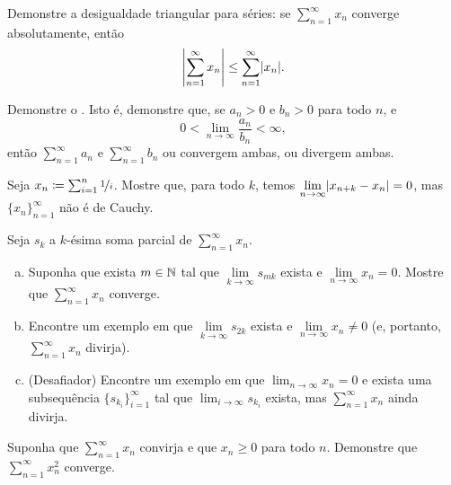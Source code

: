 \begin{exercise}
Demonstre a desigualdade triangular para séries:
se $\sum_{n=1}^\infty x_n$ converge absolutamente, então
\begin{equation*}
\left\lvert {\sum_{n=1}^\infty x_n} \right\rvert \leq
\sum_{n=1}^\infty \lvert {x_n} \rvert .
\end{equation*}
\end{exercise}

\begin{exercise}
Demonstre o \emph{}. Isto é, demonstre que, se
$a_n > 0$ e $b_n > 0$ para todo $n$, e
\begin{equation*}
0 < \lim_{n\to\infty} \frac{a_n}{b_n} < \infty ,
\end{equation*}
então $\sum_{n=1}^\infty a_n$ e $\sum_{n=1}^\infty b_n$ ou convergem ambas, ou divergem ambas.
\end{exercise}

\begin{exercise} \label{exercise:badnocauchy}
Seja $x_n \coloneqq \sum_{i=1}^n \nicefrac{1}{i}$. Mostre que, para todo $k$,
temos
$\displaystyle \lim_{n\to\infty} \lvert {x_{n+k}-x_n} \rvert = 0$, mas
$\{ x_n \}_{n=1}^\infty$ não é de Cauchy.
\end{exercise}

\begin{samepage}
\begin{exercise}
Seja $s_k$ a $k$-ésima soma parcial de $\sum_{n=1}^\infty x_n$.
\begin{enumerate}[a)]
\item
Suponha que exista $m \in {\mathbb{N}}$ tal que $\lim\limits_{k\to\infty}
s_{mk}$ exista e $\lim\limits_{n\to\infty} x_n = 0$. Mostre que
$\sum_{n=1}^\infty x_n$ converge.
\item
Encontre um exemplo em que $\lim\limits_{k\to\infty} s_{2k}$ exista e
$\lim\limits_{n\to\infty} x_n \neq 0$ (e, portanto, $\sum_{n=1}^\infty x_n$ divirja).
\item
(Desafiador) Encontre um exemplo em que $\lim_{n\to\infty} x_n = 0$ e exista
uma subsequência $\{ s_{k_i} \}_{i=1}^\infty$ tal que $\displaystyle \lim_{i\to\infty} s_{k_i}$ exista,
mas $\sum_{n=1}^\infty x_n$ ainda divirja.
\end{enumerate}
\end{exercise}
\end{samepage}

\begin{exercise} \label{exercise:squareseriesconv}
Suponha que $\sum_{n=1}^\infty x_n$ convirja e que $x_n \geq 0$ para todo $n$.
Demonstre que $\sum_{n=1}^\infty x_n^2$ converge.
\end{exercise}

